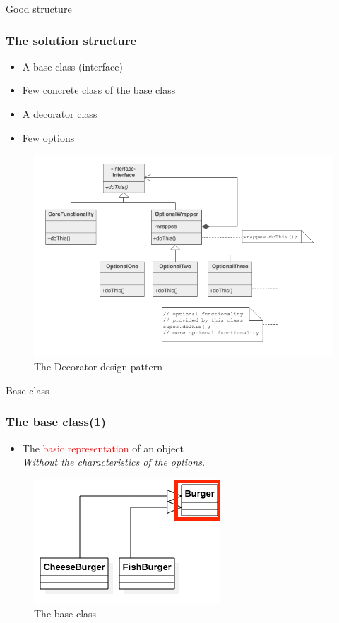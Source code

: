 \documentclass{beamer}
\begin{document}
  \begin{frame}{Good structure}
    \frametitle{The solution structure}
    \begin{itemize}
      \item A base class (interface)
      \item Few concrete class of the base class
      \item A decorator class
      \item Few options
    \end{itemize}
    \begin{figure}[!b]
      \centering
      \includegraphics[scale=0.27]{good}
      \caption{The Decorator design pattern}
    \end{figure}
  \end{frame}

  \begin{frame}{Base class}
    \frametitle{The base class(1)}
    \begin{itemize}
      \item The \textcolor{red}{basic representation} of an object \\
      \textit{Without the characteristics of the options.}
    \end{itemize}
    \begin{figure}[!b]
      \centering
      \includegraphics[scale=0.4]{Base}
      \caption{The base class}
    \end{figure}
  \end{frame}
\end{document}
